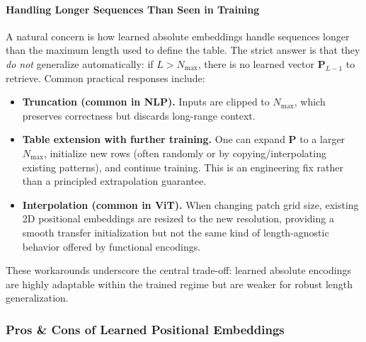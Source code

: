 \paragraph{Handling Longer Sequences Than Seen in Training}
\noindent
A natural concern is how learned absolute embeddings handle sequences longer than the maximum length used to define the table.
The strict answer is that they \emph{do not} generalize automatically:
if \(L > N_{\max}\), there is no learned vector \(\mathbf{P}_{L-1}\) to retrieve.
Common practical responses include:
\begin{itemize}
	\item \textbf{Truncation (common in NLP).}
	Inputs are clipped to \(N_{\max}\), which preserves correctness but discards long-range context.
	
	\item \textbf{Table extension with further training.}
	One can expand \(\mathbf{P}\) to a larger \(N_{\max}\), initialize new rows (often randomly or by copying/interpolating existing patterns), and continue training.
	This is an engineering fix rather than a principled extrapolation guarantee.
	
	\item \textbf{Interpolation (common in ViT).}
	When changing patch grid size, existing 2D positional embeddings are resized to the new resolution,
	providing a smooth transfer initialization but not the same kind of length-agnostic behavior offered by functional encodings.
\end{itemize}

\noindent
These workarounds underscore the central trade-off:
learned absolute encodings are highly adaptable within the trained regime but are weaker for robust length generalization.

\newpage

\subsubsection{Pros \& Cons of Learned Positional Embeddings}

